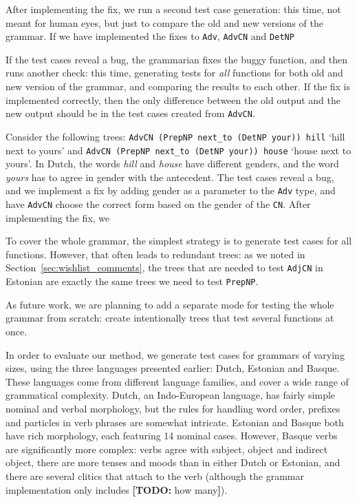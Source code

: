 \documentclass[11pt]{article}
\def\t#1{\texttt{#1}}
\newcommand{\todo}[1]{{\color{cyan}\textbf{[TODO: }#1\textbf{]}}}
\begin{document}
After implementing the fix, we run a second test case generation: this
time, not meant for human eyes, but just to compare the old and new
versions of the grammar. If we have implemented the fixes to \t{Adv},
\t{AdvCN} and \t{DetNP}


If
the test cases reveal a bug, the grammarian fixes the buggy function,
and then runs another check: this time, generating tests for
\emph{all} functions for both old and new version of the grammar, and
comparing the results to each other. If the fix is implemented
correctly, then the only difference between the old output and the new
output should be in the test cases created from \t{AdvCN}.

Consider the following trees: \t{AdvCN (PrepNP next\_to (DetNP your))
  hill} `hill next to yours' and \t{AdvCN (PrepNP next\_to (DetNP
  your)) house} `house next to yours'. In Dutch, the words \emph{hill}
and \emph{house} have different genders, and the word \emph{yours} has
to agree in gender with the antecedent. The test cases reveal a bug,
and we implement a fix by adding gender as a parameter to the \t{Adv}
type, and have \t{AdvCN} choose the correct form based on the gender
of the \t{CN}. After implementing the fix, we



To cover the whole grammar, the simplest strategy is to generate test
cases for all functions. However, that often leads to redundant trees:
as we noted in Section~\ref{sec:wishlist_comments}, the trees that
are needed to test \t{AdjCN} in Estonian are exactly the same
trees we need to test \t{PrepNP}. 


As future work, we are planning to add a separate mode for testing the
whole grammar from scratch: create intentionally trees that test
several functions at once.

In order to evaluate our method, we generate test cases for grammars
of varying sizes, using the three languages presented earlier: Dutch,
Estonian and Basque. These languages come from different language
families, and cover a wide range of grammatical complexity. Dutch, an
Indo-European language, has fairly simple nominal and verbal
morphology, but the rules for handling word order, prefixes and
particles in verb phrases are somewhat intricate. Estonian and Basque
both have rich morphology, each featuring 14 nominal cases. However, Basque
verbs are significantly more complex: verbs agree with subject, object
and indirect object, there are more tenses and moods than in either
Dutch or Estonian, and there are several clitics that attach to the
verb (although the grammar implementation only includes \todo{how
  many}). 
\end{document}
